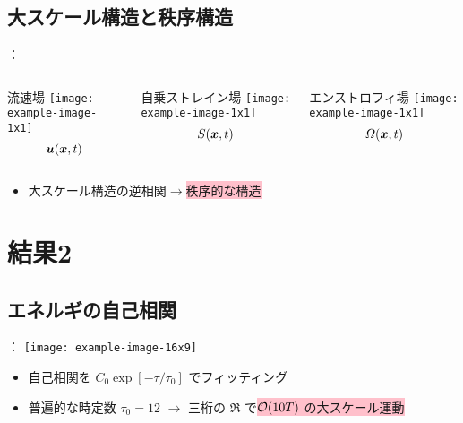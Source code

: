 \documentclass[12pt,dvipdfmx,svgnames,uplatex,aspectratio=169]{beamer}
\begin{document}
\subsection{大スケール構造と秩序構造}
\begin{frame}{\insertsection：\insertsubsection}
  \begin{columns}[T]
    \begin{column}{0.33\textwidth}
      \begin{block}{流速場}
        \centering
        \texttt{[image: example-image-1x1]}
        \begin{equation*}
          \vb*{u}(\vb*{x}, t)
        \end{equation*}
      \end{block}
    \end{column}
    \begin{column}{0.33\textwidth}
      \begin{block}{自乗ストレイン場}
        \centering
        \texttt{[image: example-image-1x1]}
        \begin{equation*}
          S(\vb*{x}, t)
        \end{equation*}
      \end{block}
    \end{column}
    \begin{column}{0.33\textwidth}
      \begin{block}{エンストロフィ場}
        \centering
        \texttt{[image: example-image-1x1]}
        \begin{equation*}
          \varOmega(\vb*{x}, t)
        \end{equation*}
      \end{block}
    \end{column}
  \end{columns}
  \begin{itemize}
    \item 大スケール構造の逆相関\(\to\)\colorbox{pink}{秩序的な構造}
  \end{itemize}
\end{frame}


\section{結果2}
\subsection{エネルギの自己相関}
\begin{frame}{\insertsection：\insertsubsection}
  \centering
  \texttt{[image: example-image-16x9]}
  \begin{itemize}
    \item 自己相関を \(C_0\exp[-\tau/\tau_0]\) でフィッティング
    \item 普遍的な時定数 \(\tau_0=12\) \(\to\) 三桁の \(\Re\) で\colorbox{pink}{\(\order{10T}\) の大スケール運動}
  \end{itemize}
\end{frame}
\end{document}
